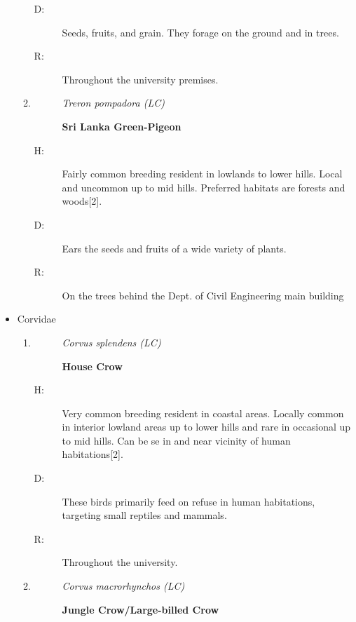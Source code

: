 \begin{itemize}
\begin{enumerate}
\begin{description}
\item[D: ]%
Seeds, fruits, and grain. They forage on the ground and in trees.%
\item[R: ]%
Throughout the university premises.%
\end{description}%
\item%
\begin{description}%
\item[]%
\textit{Treron pompadora (LC)}%
\item[]%
\textbf{Sri Lanka Green{-}Pigeon}%
\end{description}%
\begin{description}%
\item[H: ]%
Fairly common breeding resident in lowlands to lower hills. Local and uncommon up to mid hills. Preferred habitats are forests and woods{[}2{]}.%
\item[D: ]%
 Ears the seeds and fruits of a wide variety of plants.%
\item[R: ]%
On the trees behind the Dept. of Civil Engineering main building%
\end{description}%
\end{enumerate}%
\item%
Corvidae%
\begin{enumerate}%
\item%
\begin{description}%
\item[]%
\textit{Corvus splendens (LC)}%
\item[]%
\textbf{House Crow}%
\end{description}%
\begin{description}%
\item[H: ]%
Very common breeding resident in coastal areas. Locally common in interior lowland areas up to lower hills and rare in occasional up to mid hills. Can be se in and near vicinity of human habitations{[}2{]}.%
\item[D: ]%
These birds primarily feed on refuse in human habitations, targeting small reptiles and mammals. %
\item[R: ]%
Throughout the university. %
\end{description}%
\item%
\begin{description}%
\item[]%
\textit{Corvus macrorhynchos (LC)}%
\item[]%
\textbf{Jungle Crow/Large{-}billed Crow}%
\end{description}%
\begin{description}%

\end{description}
\end{enumerate}
\end{itemize}
